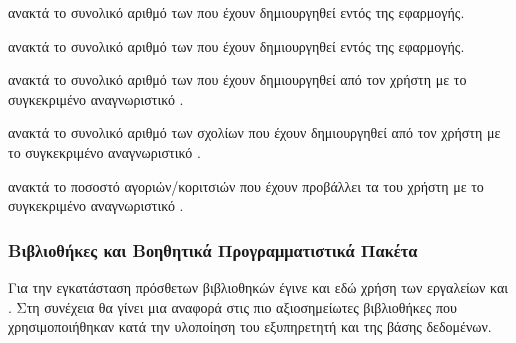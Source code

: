 \begin{itemize}
    \newline \newline
    \textbf{}
    \newline \newline \noindent
    ανακτά το συνολικό αριθμό των  που έχουν δημιουργηθεί εντός της εφαρμογής.
    
    \newline \newline
    \textbf{}
    \newline \newline \noindent
    ανακτά το συνολικό αριθμό των  που έχουν δημιουργηθεί εντός της εφαρμογής.
    
    \newline \newline
    \textbf{}
    \newline \newline \noindent
    ανακτά το συνολικό αριθμό των  που έχουν δημιουργηθεί από τον χρήστη με το συγκεκριμένο αναγνωριστικό .
    
    \newline \newline
    \textbf{}
    \newline \newline \noindent
    ανακτά το συνολικό αριθμό των σχολίων που έχουν δημιουργηθεί από τον χρήστη με το συγκεκριμένο αναγνωριστικό .
    
    \newline \newline
    \textbf{}
    \newline \newline \noindent
    ανακτά το ποσοστό αγοριών/κοριτσιών που έχουν προβάλλει τα  του χρήστη με το συγκεκριμένο αναγνωριστικό .
    
   
\end{itemize}

\subsubsection{Βιβλιοθήκες και Βοηθητικά Προγραμματιστικά Πακέτα}
Για την εγκατάσταση πρόσθετων βιβλιοθηκών έγινε και εδώ χρήση των εργαλείων  και . Στη συνέχεια θα γίνει μια αναφορά στις πιο αξιοσημείωτες βιβλιοθήκες που χρησιμοποιήθηκαν κατά την υλοποίηση του εξυπηρετητή και της βάσης δεδομένων.

